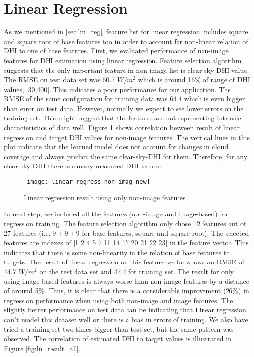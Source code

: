 \section{Linear Regression}
As we mentioned in \ref{sec:lin_reg}, feature list for linear regression includes square and square root of base features too in order to account for non-linear relation of DHI to one of base features. 
First, we evaluated performance of non-image features for DHI estimation using linear regression. Feature selection algorithm suggests that the only important feature in non-image list is clear-sky DHI value. The RMSE on test data set was 60.7 $W/m^2$ which is around 16\% of range of DHI values, [30,400]. This indicates a poor performance for our application. The RMSE of the same configuration for training data was 64.4 which is even bigger than error on test data. However, normally we expect to see lower errors on the training set. This might suggest that the features are not representing intrinsic characteristics of data well. Figure \ref{fig:ln_result_no_image} shows correlation between result of linear regression and target DHI values for non-image features. The vertical lines in this plot indicate that the learned model does not account for changes in cloud coverage and always predict the same clear-sky-DHI for them. Therefore, for any clear-sky DHI there are many measured DHI values.

\begin{figure}[h!]
\caption{Linear regression result using only non-image features}
\label{fig:ln_result_no_image}
\texttt{[image: linear\_regress\_non\_imag\_new]}
\centering
\end{figure}

In next step, we included all the features (non-image and image-based) for regression training. The feature selection algorithm only chose 12 features out of 27 features (i.e. $9+9+9$ for base features, square and square root). The selected features are indexes of [1 2 4 5 7 11 14 17 20 21 22 23] in the feature vector. This indicates that there is some non-linearity in the relation of base features to targets. The result of linear regression on this feature vector shows an RMSE of 44.7  $W/m^2$ on the test data set and 47.4 for training set. The result for only using image-based features is always worse than non-image features by a distance of around 5\%. Thus, it is clear that there is a considerable improvement (26\%) in regression performance when using both non-image and image features. The slightly better performance on test data can be indicating that Linear regression can't model this dataset well or there is a bias in errors of training. We also have tried a training set two times bigger than test set, but the same pattern was observed. The correlation of estimated DHI to target values is illustrated in Figure \ref{fig:ln_result_all}. 

